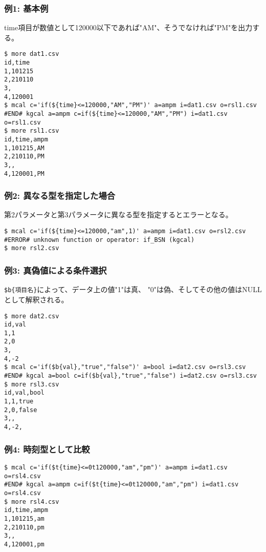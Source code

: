 \subsubsection*{例1: 基本例}

time項目が数値として120000以下であれば"AM"、そうでなければ"PM"を出力する。


\begin{Verbatim}[baselinestretch=0.7,frame=single]
$ more dat1.csv
id,time
1,101215
2,210110
3,
4,120001
$ mcal c='if(${time}<=120000,"AM","PM")' a=ampm i=dat1.csv o=rsl1.csv
#END# kgcal a=ampm c=if(${time}<=120000,"AM","PM") i=dat1.csv o=rsl1.csv
$ more rsl1.csv
id,time,ampm
1,101215,AM
2,210110,PM
3,,
4,120001,PM
\end{Verbatim}
\subsubsection*{例2: 異なる型を指定した場合}

第2パラメータと第3パラメータに異なる型を指定するとエラーとなる。


\begin{Verbatim}[baselinestretch=0.7,frame=single]
$ mcal c='if(${time}<=120000,"am",1)' a=ampm i=dat1.csv o=rsl2.csv
#ERROR# unknown function or operator: if_BSN (kgcal)
$ more rsl2.csv
\end{Verbatim}
\subsubsection*{例3: 真偽値による条件選択}

\verb|$b{項目名}|によって、データ上の値"1"は真、
"0"は偽、そしてその他の値はNULLとして解釈される。


\begin{Verbatim}[baselinestretch=0.7,frame=single]
$ more dat2.csv
id,val
1,1
2,0
3,
4,-2
$ mcal c='if($b{val},"true","false")' a=bool i=dat2.csv o=rsl3.csv
#END# kgcal a=bool c=if($b{val},"true","false") i=dat2.csv o=rsl3.csv
$ more rsl3.csv
id,val,bool
1,1,true
2,0,false
3,,
4,-2,
\end{Verbatim}
\subsubsection*{例4: 時刻型として比較}



\begin{Verbatim}[baselinestretch=0.7,frame=single]
$ mcal c='if($t{time}<=0t120000,"am","pm")' a=ampm i=dat1.csv o=rsl4.csv
#END# kgcal a=ampm c=if($t{time}<=0t120000,"am","pm") i=dat1.csv o=rsl4.csv
$ more rsl4.csv
id,time,ampm
1,101215,am
2,210110,pm
3,,
4,120001,pm
\end{Verbatim}
